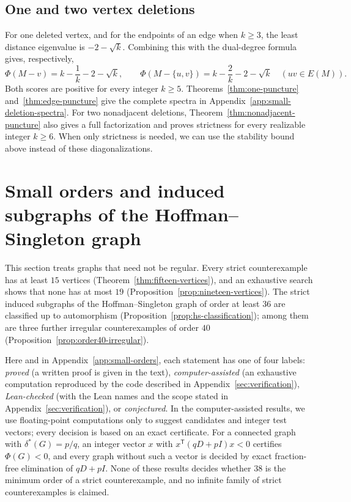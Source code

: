 \documentclass[a4paper,10pt,reqno]{amsart}
\theoremstyle{plain}
\theoremstyle{definition}
\theoremstyle{remark}
\begin{document}
\subsection{One and two vertex deletions}

For one deleted vertex, and for the endpoints of an edge when \(k\ge3\),
the least distance eigenvalue is \(-2-\sqrt{k}\). Combining this with the
dual-degree formula gives, respectively,
\[
 \Phi(M-v)=k-\frac1k-2-\sqrt{k},
 \qquad
 \Phi(M-\{u,v\})=k-\frac2k-2-\sqrt{k}\quad(uv\in E(M)).
\]
Both scores are positive for every integer \(k\ge5\).
Theorems~\ref{thm:one-puncture} and~\ref{thm:edge-puncture} give the
complete spectra in Appendix~\ref{app:small-deletion-spectra}.
For two nonadjacent deletions, Theorem~\ref{thm:nonadjacent-puncture}
also gives a full factorization and proves strictness for every realizable
integer \(k\ge6\). When only strictness is needed, we can use the stability
bound above instead of these diagonalizations.

\section{Small orders and induced subgraphs of the Hoffman--Singleton graph}
\label{sec:small-order-bounds}

This section treats graphs that need not be regular. Every strict
counterexample has at least \(15\) vertices
(Theorem~\ref{thm:fifteen-vertices}), and an exhaustive search shows that none
has at most \(19\) (Proposition~\ref{prop:nineteen-vertices}). The strict induced
subgraphs of the Hoffman--Singleton graph of order at least \(36\) are
classified up to automorphism (Proposition~\ref{prop:hs-classification});
among them are three further irregular counterexamples of order \(40\)
(Proposition~\ref{prop:order40-irregular}).

Here and in Appendix~\ref{app:small-orders}, each statement
has one of four labels: \emph{proved} (a written
proof is given in the text), \emph{computer-assisted} (an exhaustive computation
reproduced by the code described in Appendix~\ref{sec:verification}),
\emph{Lean-checked} (with the Lean names and the scope stated in
Appendix~\ref{sec:verification}), or \emph{conjectured}. In the
computer-assisted results, we use floating-point computations only to
suggest candidates and integer test vectors; every decision is based on an
exact certificate. For a connected graph with \(\delta^*(G)=p/q\), an integer
vector \(x\) with \(x^{\mathsf T}(qD+pI)x<0\) certifies \(\Phi(G)<0\), and
every graph without such a vector is decided by exact fraction-free
elimination of \(qD+pI\). None of these
results decides whether \(38\) is the minimum order of a strict
counterexample, and no infinite family of strict counterexamples is claimed.
\end{document}
